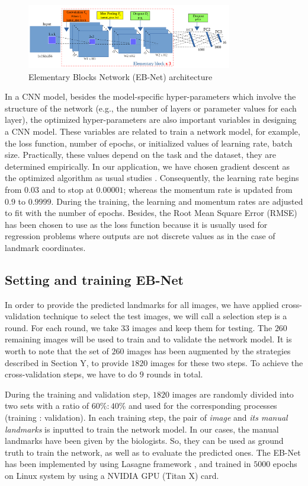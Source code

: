 \documentclass[review]{elsarticle}
\begin{document}
\begin{figure}[h!]
	\centering
	\includegraphics[width=0.8\textwidth]{images/model3}
	\caption{Elementary Blocks Network (EB-Net) architecture}
	\label{figebnet}
\end{figure}

In a CNN model, besides the model-specific hyper-parameters which involve the structure of the network (e.g., the number of layers or parameter values for each layer), the optimized hyper-parameters are also important variables in designing a CNN model. These variables are related to train a network model, for example, the loss function, number of epochs, or initialized values of learning rate, batch size. Practically, these values depend on the task and the dataset, they are determined empirically. In our application, we have chosen gradient descent as the optimized algorithm as usual studies \cite{}. Consequently, the learning rate begins from $0.03$ and to stop at $0.00001$; whereas the momentum rate is updated from $0.9$ to $0.9999$. During the training, the learning and momentum rates are adjusted to fit with the number of epochs. Besides, the Root Mean Square Error (RMSE) has been chosen to use as the loss function because it is usually used for regression problems where outputs are not discrete values as in the case of landmark coordinates. 

\subsection{Setting and training EB-Net}
In order to provide the predicted landmarks for all images, we have applied cross-validation technique to select the test images, we will call a selection step is a round. For each round, we take $33$ images and keep them for testing. The $260$ remaining images will be used to train and to validate the network model. It is worth to note that the set of $260$ images has been augmented by the strategies described in Section Y, to provide $1820$ images for these two steps. To achieve the cross-validation steps, we have to do $9$ rounds in total. 

During the training and validation step, $1820$ images are randomly divided into two sets with a ratio of $60\% : 40\%$ and used for the corresponding processes (training : validation). In each training step, the pair of \textit{image} and \textit{its manual landmarks} is inputted to train the network model. In our cases, the manual landmarks have been given by the biologists. So, they can be used as ground truth to train the network, as well as to evaluate the predicted ones. The EB-Net has been implemented by using Lasagne framework \cite{}, and trained in $5000$ epochs on Linux system by using a NVIDIA GPU (Titan X) card.
\end{document}
